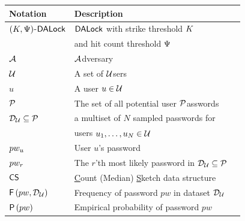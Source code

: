\clearpage
\appendix




\begin{table}[htb]
	\vspace{-0.2cm}
	\begin{tabular}{|l|l|l|}\hline
		
		Notation      & Description                                                                   \\\hline
		
		$(K, \Psi)$-$\mathsf{DALock}$  & $\mathsf{DALock}$ with strike threshold $K$                 \\        
		& and hit count threshold $\Psi$    \\\hline
		$\mathcal{A}$  & \underline{$\mathcal{A}$}dversary                            \\\hline
		
		$\mathcal{U}$ & A set of {$\mathcal{U}$}sers           \\\hline
		
		$u$           & A user  $u \in \mathcal{U}$                                                    \\\hline
		
		$\mathcal{P}$ & The set of all potential user \underline{$\mathcal{P}$}asswords \\\hline
		
		$\mathcal{D}_{{\mathcal{U}}} \subseteq \mathcal{P}$ & a multiset of $N$ sampled passwords  for\\
		
		& users $u_1,\ldots,u_N \in \mathcal{U}$ \\ \hline
		
		$pw_{u}$         & User $u$'s password   \\\hline
		
		$pw_{r}$         & The $r$'th most likely password in $\mathcal{D}_{{\mathcal{U}}} \subseteq \mathcal{P}$ \\\hline
		
		$\mathsf{CS}$ & \underline{C}ount (Median) \underline{S}ketch data structure\\    \hline    	
		
		$\mathsf{F}\left(pw, \mathcal{D}_{{\mathcal{U}}}\right)$ & Frequency of password $pw$ in dataset $\mathcal{D}_{{\mathcal{U}}}$ \\\hline
		
		$\mathsf{P}\left(pw\right)$ & Empirical probability of password $pw$  \\\hline        
		

\end{tabular}
\end{table}
